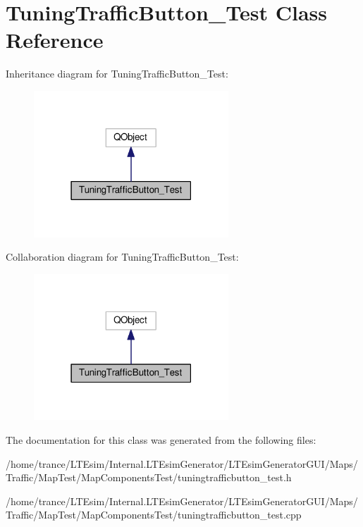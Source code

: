 \hypertarget{class_tuning_traffic_button___test}{}\section{Tuning\+Traffic\+Button\+\_\+\+Test Class Reference}
\label{class_tuning_traffic_button___test}


Inheritance diagram for Tuning\+Traffic\+Button\+\_\+\+Test\+:
\nopagebreak
\begin{figure}[H]
\begin{center}
\leavevmode
\includegraphics[width=207pt]{class_tuning_traffic_button___test__inherit__graph}
\end{center}
\end{figure}


Collaboration diagram for Tuning\+Traffic\+Button\+\_\+\+Test\+:
\nopagebreak
\begin{figure}[H]
\begin{center}
\leavevmode
\includegraphics[width=207pt]{class_tuning_traffic_button___test__coll__graph}
\end{center}
\end{figure}


The documentation for this class was generated from the following files\+:\begin{DoxyCompactItemize}
\item 
/home/trance/\+L\+T\+Esim/\+Internal.\+L\+T\+Esim\+Generator/\+L\+T\+Esim\+Generator\+G\+U\+I/\+Maps/\+Traffic/\+Map\+Test/\+Map\+Components\+Test/tuningtrafficbutton\+\_\+test.\+h\item 
/home/trance/\+L\+T\+Esim/\+Internal.\+L\+T\+Esim\+Generator/\+L\+T\+Esim\+Generator\+G\+U\+I/\+Maps/\+Traffic/\+Map\+Test/\+Map\+Components\+Test/tuningtrafficbutton\+\_\+test.\+cpp\end{DoxyCompactItemize}
